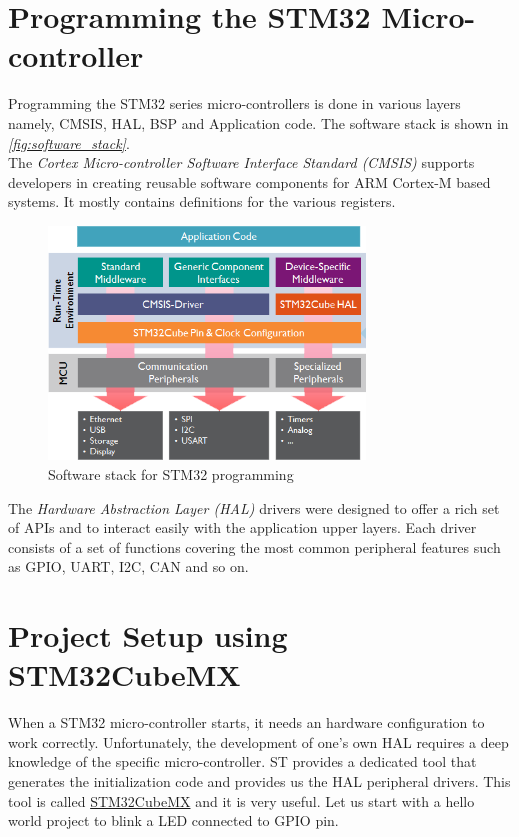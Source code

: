 \documentclass[a4paper,12pt,oneside]{book}
\begin{document}
\section{Programming the STM32 Micro-controller}
\label{sec:progstm32}

Programming the STM32 series micro-controllers is done in various layers namely, CMSIS, HAL, BSP and Application code. The software stack is shown in \textit{\autoref{fig:software_stack}}.\\

The \textit{Cortex Micro-controller Software Interface Standard (CMSIS)} supports developers in creating reusable software components for ARM Cortex-M based systems. It mostly contains definitions for the various registers.\\

\begin{figure}[!htb]
\centering
\includegraphics[width=0.75\textwidth]{images/software_stack}
\caption{Software stack for STM32 programming}
\label{fig:software_stack}
\end{figure}

The \textit{Hardware Abstraction Layer (HAL)} drivers were designed to offer a rich set of APIs and to interact easily with the application upper layers. Each driver consists of a set of functions covering the most common peripheral features such as GPIO, UART, I2C, CAN and so on.\cite{stm32hal}\\

\section{Project Setup using STM32CubeMX}
When a STM32 micro-controller starts, it needs an hardware configuration to work correctly. Unfortunately, the development of one's own HAL requires a deep knowledge of the specific micro-controller. ST provides a dedicated tool that generates the initialization code and provides us the HAL peripheral drivers. This tool is called \href{http://www.st.com/en/development-tools/stm32cubemx.html}{STM32CubeMX} and it is very useful.\cite{carmine} Let us start with a hello world project to blink a LED connected to GPIO pin.\\
\end{document}
